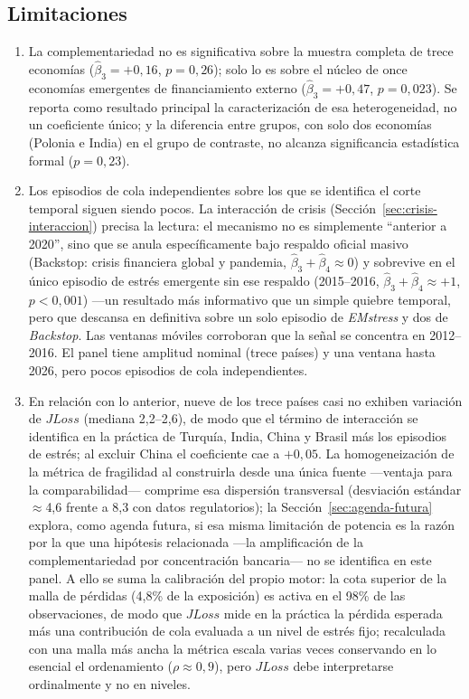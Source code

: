 \subsection{Limitaciones}

\begin{enumerate}
\item La complementariedad no es significativa sobre la muestra completa de trece economías ($\hat\beta_3=+0{,}16$, $p=0{,}26$); solo lo es sobre el núcleo de once economías emergentes de financiamiento externo ($\hat\beta_3=+0{,}47$, $p=0{,}023$). Se reporta como resultado principal la caracterización de esa heterogeneidad, no un coeficiente único; y la diferencia entre grupos, con solo dos economías (Polonia e India) en el grupo de contraste, no alcanza significancia estadística formal ($p=0{,}23$).

\item Los episodios de cola independientes sobre los que se identifica el corte temporal siguen siendo pocos. La interacción de crisis (Sección~\ref{sec:crisis-interaccion}) precisa la lectura: el mecanismo no es simplemente ``anterior a 2020'', sino que se anula específicamente bajo respaldo oficial masivo (Backstop: crisis financiera global y pandemia, $\hat\beta_3+\hat\beta_4\approx0$) y sobrevive en el único episodio de estrés emergente sin ese respaldo (2015--2016, $\hat\beta_3+\hat\beta_4\approx+1$, $p<0{,}001$) —un resultado más informativo que un simple quiebre temporal, pero que descansa en definitiva sobre un solo episodio de \textit{EMstress} y dos de \textit{Backstop}. Las ventanas móviles corroboran que la señal se concentra en 2012--2016. El panel tiene amplitud nominal (trece países) y una ventana hasta 2026, pero pocos episodios de cola independientes.

\item En relación con lo anterior, nueve de los trece países casi no exhiben variación de $JLoss$ (mediana 2,2--2,6), de modo que el término de interacción se identifica en la práctica de Turquía, India, China y Brasil más los episodios de estrés; al excluir China el coeficiente cae a $+0{,}05$. La homogeneización de la métrica de fragilidad al construirla desde una única fuente —ventaja para la comparabilidad— comprime esa dispersión transversal (desviación estándar $\approx$4,6 frente a 8,3 con datos regulatorios); la Sección~\ref{sec:agenda-futura} explora, como agenda futura, si esa misma limitación de potencia es la razón por la que una hipótesis relacionada —la amplificación de la complementariedad por concentración bancaria— no se identifica en este panel. A ello se suma la calibración del propio motor: la cota superior de la malla de pérdidas (4,8\% de la exposición) es activa en el 98\% de las observaciones, de modo que $JLoss$ mide en la práctica la pérdida esperada más una contribución de cola evaluada a un nivel de estrés fijo; recalculada con una malla más ancha la métrica escala varias veces conservando en lo esencial el ordenamiento ($\rho\approx0{,}9$), pero $JLoss$ debe interpretarse ordinalmente y no en niveles.


\end{enumerate}
